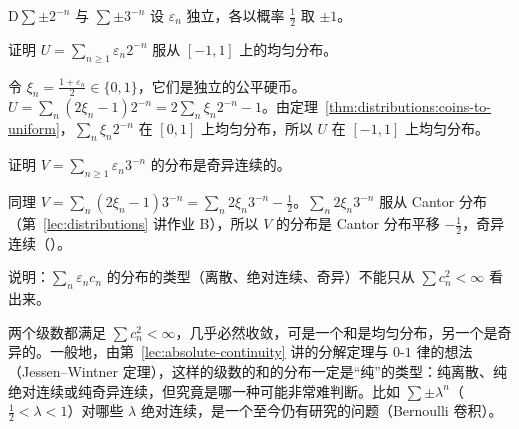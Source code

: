 
\begin{probleme}{D}{$\sum\pm2^{-n}$ 与 $\sum\pm3^{-n}$}
设 $\varepsilon_n$ 独立，各以概率 $\frac12$ 取 $\pm1$。
\begin{questions}
\item 证明 $U=\sum_{n\geqslant1}\varepsilon_n2^{-n}$ 服从 $[-1,1]$ 上的均匀分布。
\begin{solution}
令 $\xi_n=\frac{1+\varepsilon_n}2\in\{0,1\}$，它们是独立的公平硬币。$U=\sum_n(2\xi_n-1)2^{-n}=2\sum_n\xi_n2^{-n}-1$。由定理~\ref{thm:distributions:coins-to-uniform}，$\sum_n\xi_n2^{-n}$ 在 $[0,1]$ 上均匀分布，所以 $U$ 在 $[-1,1]$ 上均匀分布。
\end{solution}
\item 证明 $V=\sum_{n\geqslant1}\varepsilon_n3^{-n}$ 的分布是奇异连续的。
\begin{solution}
同理 $V=\sum_n(2\xi_n-1)3^{-n}=\sum_n2\xi_n3^{-n}-\frac12$。$\sum_n2\xi_n3^{-n}$ 服从 Cantor 分布（第~\ref{lec:distributions} 讲作业 B），所以 $V$ 的分布是 Cantor 分布平移 $-\frac12$，奇异连续（）。
\end{solution}
\item 说明：$\sum_n\varepsilon_nc_n$ 的分布的类型（离散、绝对连续、奇异）不能只从 $\sum c_n^2<\infty$ 看出来。
\begin{solution}
两个级数都满足 $\sum c_n^2<\infty$，几乎必然收敛，可是一个和是均匀分布，另一个是奇异的。一般地，由第~\ref{lec:absolute-continuity} 讲的分解定理与 $0$-$1$ 律的想法（Jessen--Wintner 定理），这样的级数的和的分布一定是“纯”的类型：纯离散、纯绝对连续或纯奇异连续，但究竟是哪一种可能非常难判断。比如 $\sum\pm\lambda^n$（$\frac12<\lambda<1$）对哪些 $\lambda$ 绝对连续，是一个至今仍有研究的问题（Bernoulli 卷积）。
\end{solution}
\end{questions}
\end{probleme}

